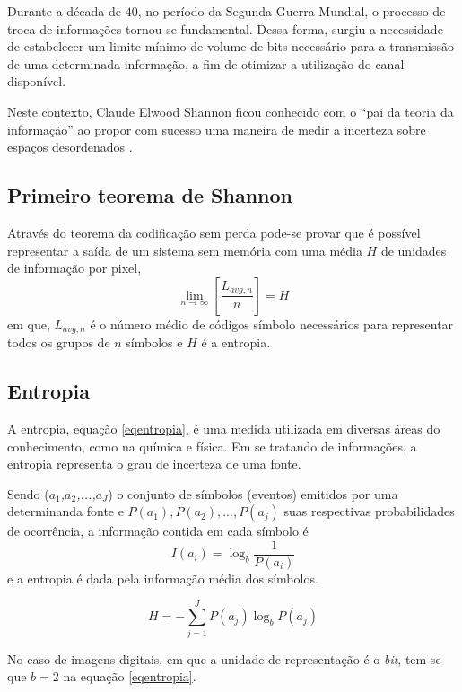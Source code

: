 Durante a década de $ 40 $, no período da Segunda Guerra Mundial, o processo de troca de informações tornou-se fundamental. Dessa forma, surgiu a necessidade de estabelecer um limite mínimo de volume de bits necessário para a transmissão de uma determinada informação, a fim de otimizar a utilização do canal disponível.

Neste contexto, Claude Elwood Shannon ficou conhecido com o ``pai da teoria da informação'' ao propor com sucesso uma maneira de medir a incerteza sobre espaços desordenados \cite{shannon48}.

\subsection{Primeiro teorema de Shannon}
\label{shannonTheorem}
Através do teorema da codificação sem perda \cite{shannon48} pode-se provar que é possível representar a saída de um sistema sem memória com uma média $ H $ de unidades de informação por pixel,
\begin{equation}
\label{eqshannonTheorem}
\lim_{n \to \infty}
\left[\frac{L_{avg,n}}{n} \right]= H
\end{equation}
em que, $ L_{avg,n} $ é o número médio de códigos símbolo necessários para representar todos os grupos de $ n $ símbolos e $ H $ é a entropia.

\subsection{Entropia}
\label{entropia}

A entropia, equação \ref{eqentropia}, é uma medida utilizada em diversas áreas do conhecimento, como na química e física. Em se tratando de informações, a entropia representa o grau de incerteza de uma fonte.

Sendo (\textit{$a_{1}$,$a_{2}$,...,$a_{J}$}) o conjunto de símbolos (eventos) emitidos por uma determinanda fonte e $P(a_{1}), P(a_{2}), ..., P(a_{j})$ suas respectivas probabilidades de ocorrência, a informação contida em cada símbolo é
\begin{equation}
\label{eqentropia}
I(a_i) = \log_b{\frac{1}{P(a_{i})}}
\end{equation}
e a entropia é dada pela informação média dos símbolos.

\begin{equation}
\label{eqentropia}
H = -\sum_{j=1}^J P(a_{j})\log_b{P(a_{j})}
\end{equation}

No caso de imagens digitais, em que a unidade de representação é o \textit{bit}, tem-se que $ b = 2$ na equação \ref{eqentropia}.

